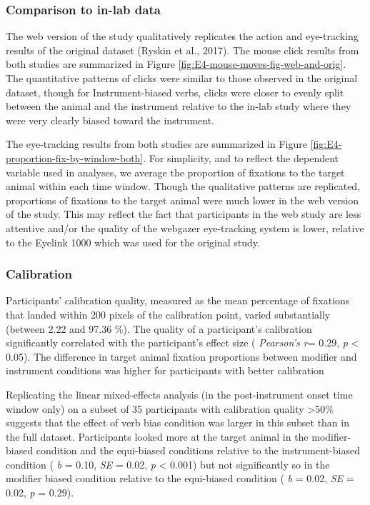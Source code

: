 \documentclass[
  man,floatsintext]{apa6}
\begin{document}
\hypertarget{comparison-to-in-lab-data}{%
\subsubsection{Comparison to in-lab data}\label{comparison-to-in-lab-data}}

The web version of the study qualitatively replicates the action and eye-tracking results of the original dataset (Ryskin et al., 2017).
The mouse click results from both studies are summarized in Figure \ref{fig:E4-mouse-moves-fig-web-and-orig}.
The quantitative patterns of clicks were similar to those observed in the original dataset, though for Instrument-biased verbs, clicks were closer to evenly split between the animal and the instrument relative to the in-lab study where they were very clearly biased toward the instrument.

The eye-tracking results from both studies are summarized in Figure \ref{fig:E4-proportion-fix-by-window-both}.
For simplicity, and to reflect the dependent variable used in analyses, we average the proportion of fixations to the target animal within each time window.
Though the qualitative patterns are replicated, proportions of fixations to the target animal were much lower in the web version of the study.
This may reflect the fact that participants in the web study are less attentive and/or the quality of the webgazer eye-tracking system is lower, relative to the Eyelink 1000 which was used for the original study.

\hypertarget{calibration-4}{%
\subsubsection{Calibration}\label{calibration-4}}

Participants' calibration quality, measured as the mean percentage of fixations that landed within 200 pixels of the calibration point, varied substantially (between 2.22 and 97.36 \%).
The quality of a participant's calibration significantly correlated with the participant's effect size ( \emph{Pearson's r}= 0.29, \emph{p} \textless{} 0.05).
The difference in target animal fixation proportions between modifier and instrument conditions was higher for participants with better calibration

Replicating the linear mixed-effects analysis (in the post-instrument onset time window only) on a subset of 35 participants with calibration quality \textgreater50\% suggests that the effect of verb bias condition was larger in this subset than in the full dataset. Participants looked more at the target animal in the modifier-biased condition and the equi-biased conditions relative to the instrument-biased condition ( \emph{b} = 0.10, \emph{SE} = 0.02, \emph{p} \textless{} 0.001) but not significantly so in the modifier biased condition relative to the equi-biased condition ( \emph{b} = 0.02, \emph{SE} = 0.02, \emph{p} = 0.29).
\end{document}
